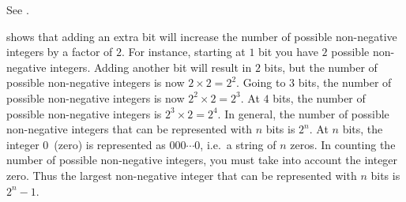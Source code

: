 \documentclass[a4paper,oneside,12pt]{article}
\begin{document}
\begin{problem}
{\begin{solution}
See .

\begin{table}[!htbp]
\centering

\caption{%
  The number of non-negative integers that can be represented with a
  given number of bits.  Going from left to right, the third column
  contains the consecutive growth factors.  Starting from the row with
  two bits downwards, the growth factor for the row is defined as the
  number of non-negative integers that can be represented with $n$
  bits divided by the number of non-negative integers that can be
  represented with $n - 1$ bits.  The right-most column contains the
  largest non-negative integer that can be represented with $n$ bits.
}
\label{tab:binary_how_many_integers}
\end{table}

 shows that adding an extra bit
will increase the number of possible non-negative integers by a factor
of $2$.  For instance, starting at $1$ bit you have $2$ possible
non-negative integers.  Adding another bit will result in $2$ bits,
but the number of possible non-negative integers is now
$2 \times 2 = 2^2$.  Going to $3$ bits, the number of possible
non-negative integers is now $2^2 \times 2 = 2^3$.  At $4$ bits, the
number of possible non-negative integers is $2^3 \times 2 = 2^4$.  In
general, the number of possible non-negative integers that can be
represented with $n$ bits is $2^n$.  At $n$ bits, the integer
$0$~(zero) is represented as $000 \cdots 0$, i.e.~a string of $n$
zeros.  In counting the number of possible non-negative integers, you
must take into account the integer zero.  Thus the largest
non-negative integer that can be represented with $n$ bits is
$2^n - 1$.
\end{solution}
}{}


\end{problem}
\end{document}
